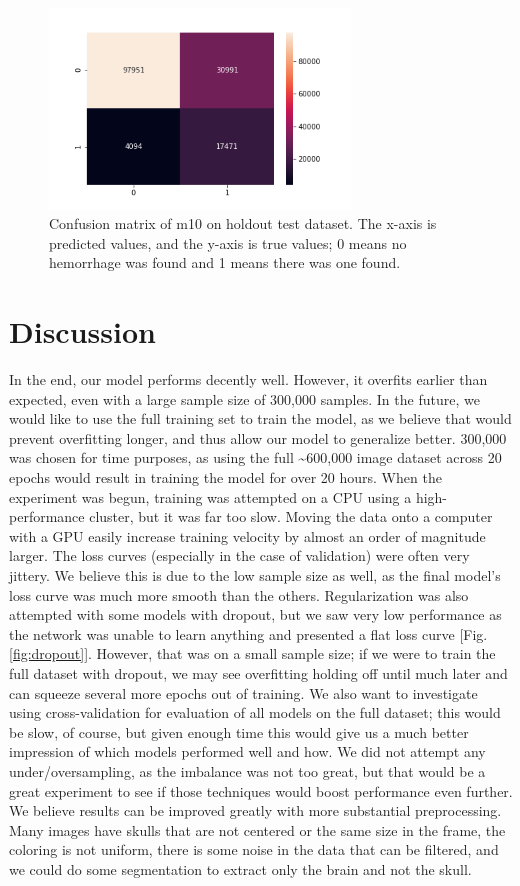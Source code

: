 \documentclass{article}
\begin{document}
\begin{figure}[]
    \centering
    \includegraphics[width=8cm]{best_model_confusion_matrix}
    \caption{Confusion matrix of m10 on holdout test dataset. The x-axis is predicted values, and the y-axis is true values; 0 means no hemorrhage was found and 1 means there was one found.}
    \label{fig:best_model_confusion_matrix}
\end{figure}
    
\newpage
\section{Discussion}

    In the end, our model performs decently well. However, it overfits earlier than expected, even with a large sample size of 300,000 samples. In the future, we would like to use the full training set to train the model, as we believe that would prevent overfitting longer, and thus allow our model to generalize better. 300,000 was chosen for time purposes, as using the full \textasciitilde600,000 image dataset across 20 epochs would result in training the model for over 20 hours. When the experiment was begun, training was attempted on a CPU using a high-performance cluster, but it was far too slow. Moving the data onto a computer with a GPU easily increase training velocity by almost an order of magnitude larger. The loss curves (especially in the case of validation) were often very jittery. We believe this is due to the low sample size as well, as the final model's loss curve was much more smooth than the others. Regularization was also attempted with some models with dropout, but we saw very low performance as the network was unable to learn anything and presented a flat loss curve [Fig. \ref{fig:dropout}]. However, that was on a small sample size; if we were to train the full dataset with dropout, we may see overfitting holding off until much later and can squeeze several more epochs out of training. We also want to investigate using cross-validation for evaluation of all models on the full dataset; this would be slow, of course, but given enough time this would give us a much better impression of which models performed well and how. We did not attempt any under/oversampling, as the imbalance was not too great, but that would be a great experiment to see if those techniques would boost performance even further. We believe results can be improved greatly with more substantial preprocessing. Many images have skulls that are not centered or the same size in the frame, the coloring is not uniform, there is some noise in the data that can be filtered, and we could do some segmentation to extract only the brain and not the skull.
\end{document}

